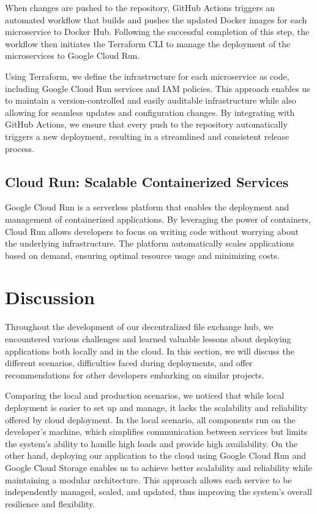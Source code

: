 \documentclass[a4paper,fleqn]{cas-dc}
\begin{document}
When changes are pushed to the repository, GitHub Actions triggers an automated workflow that builds and pushes the updated Docker images for each microservice to Docker Hub. Following the successful completion of this step, the workflow then initiates the Terraform CLI to manage the deployment of the microservices to Google Cloud Run.

Using Terraform, we define the infrastructure for each microservice as code, including Google Cloud Run services and IAM policies. This approach enables us to maintain a version-controlled and easily auditable infrastructure while also allowing for seamless updates and configuration changes. By integrating with GitHub Actions, we ensure that every push to the repository automatically triggers a new deployment, resulting in a streamlined and consistent release process.

\subsection{Cloud Run: Scalable Containerized Services}

Google Cloud Run is a serverless platform that enables the deployment and management of containerized applications. By leveraging the power of containers, Cloud Run allows developers to focus on writing code without worrying about the underlying infrastructure. The platform automatically scales applications based on demand, ensuring optimal resource usage and minimizing costs.

\section{Discussion} \label{sec:discussion}

Throughout the development of our decentralized file exchange hub, we encountered various challenges and learned valuable lessons about deploying applications both locally and in the cloud. In this section, we will discuss the different scenarios, difficulties faced during deployments, and offer recommendations for other developers embarking on similar projects.

Comparing the local and production scenarios, we noticed that while local deployment is easier to set up and manage, it lacks the scalability and reliability offered by cloud deployment. In the local scenario, all components run on the developer's machine, which simplifies communication between services but limits the system's ability to handle high loads and provide high availability. On the other hand, deploying our application to the cloud using Google Cloud Run and Google Cloud Storage enables us to achieve better scalability and reliability while maintaining a modular architecture. This approach allows each service to be independently managed, scaled, and updated, thus improving the system's overall resilience and flexibility.
\end{document}
